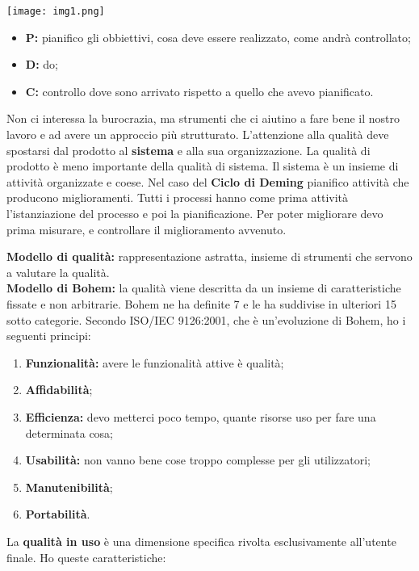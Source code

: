 \texttt{[image: img1.png]}
\begin{itemize}
	\item \textbf{P:} pianifico gli obbiettivi, cosa deve essere realizzato, come andrà controllato;
	\item \textbf{D:} do;
	\item \textbf{C:} controllo dove sono arrivato rispetto a quello che avevo pianificato.
\end{itemize}


Non ci interessa la burocrazia, ma strumenti che ci aiutino a fare bene il nostro lavoro e ad avere un approccio più strutturato. L'attenzione alla qualità deve spostarsi dal prodotto al \textbf{sistema} e alla sua organizzazione. La qualità di prodotto è meno importante della qualità di sistema. Il sistema è un insieme di attività organizzate e coese.
Nel caso del \textbf{Ciclo di Deming} pianifico attività che producono miglioramenti. Tutti i processi hanno come prima attività l'istanziazione del processo e poi la pianificazione. Per poter migliorare devo prima misurare, e controllare il miglioramento avvenuto.

\textbf{Modello di qualità:} rappresentazione astratta, insieme di strumenti che servono a valutare la qualità.\\ 
\textbf{Modello di Bohem:} la qualità viene descritta da un insieme di caratteristiche fissate e non arbitrarie. Bohem ne ha definite 7 e le ha suddivise in ulteriori 15 sotto categorie. Secondo ISO/IEC 9126:2001, che è un'evoluzione di Bohem, ho i seguenti principi:

\begin{enumerate}

	\item \textbf{Funzionalità:} avere le funzionalità attive è qualità;
	\item \textbf{Affidabilità};
	\item \textbf{Efficienza:} devo metterci poco tempo, quante risorse uso per fare una determinata cosa;
	\item \textbf{Usabilità:} non vanno bene cose troppo complesse per gli utilizzatori;
	\item \textbf{Manutenibilità};
	\item \textbf{Portabilità}.

\end{enumerate}

La \textbf{qualità in uso} è una dimensione specifica rivolta esclusivamente all'utente finale. Ho queste caratteristiche:

